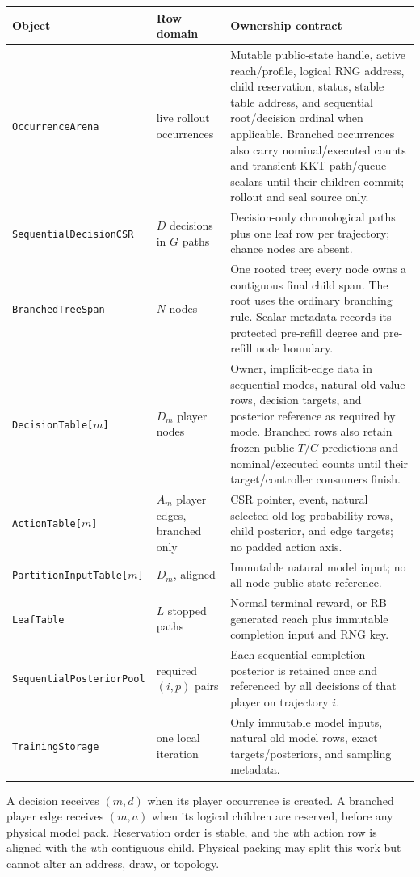 \documentclass[10pt,a4paper]{article}
\newcommand{\Obj}[1]{\texttt{#1}}
\begin{document}
\begin{longtable}{p{}p{}p{}}
\toprule
Object & Row domain & Ownership contract \\
\midrule
\endhead
\Obj{OccurrenceArena} & live rollout occurrences & Mutable public-state handle, active reach/profile, logical RNG address, child reservation, status, stable table address, and sequential root/decision ordinal when applicable.  Branched occurrences also carry nominal/executed counts and transient KKT path/queue scalars until their children commit; rollout and seal source only. \\
\Obj{SequentialDecisionCSR} & $D$ decisions in $G$ paths & Decision-only chronological paths plus one leaf row per trajectory; chance nodes are absent. \\
\Obj{BranchedTreeSpan} & $N$ nodes & One rooted tree; every node owns a contiguous final child span.  The root uses the ordinary branching rule.  Scalar metadata records its protected pre-refill degree and pre-refill node boundary. \\
\Obj{DecisionTable[$m$]} & $D_m$ player nodes & Owner, implicit-edge data in sequential modes, natural old-value rows, decision targets, and posterior reference as required by mode.  Branched rows also retain frozen public $T/C$ predictions and nominal/executed counts until their target/controller consumers finish. \\
\Obj{ActionTable[$m$]} & $A_m$ player edges, branched only & CSR pointer, event, natural selected old-log-probability rows, child posterior, and edge targets; no padded action axis. \\
\Obj{PartitionInputTable[$m$]} & $D_m$, aligned & Immutable natural model input; no all-node public-state reference. \\
\Obj{LeafTable} & $L$ stopped paths & Normal terminal reward, or RB generated reach plus immutable completion input and RNG key. \\
\Obj{SequentialPosteriorPool} & required $(i,p)$ pairs & Each sequential completion posterior is retained once and referenced by all decisions of that player on trajectory $i$. \\
\Obj{TrainingStorage} & one local iteration & Only immutable model inputs, natural old model rows, exact targets/posteriors, and sampling metadata. \\
\bottomrule
\end{longtable}

A decision receives $(m,d)$ when its player occurrence is created.  A branched
player edge receives $(m,a)$ when its logical children are reserved, before any
physical model pack.  Reservation order is stable, and the $u$th action row is
aligned with the $u$th contiguous child.  Physical packing may split this work
but cannot alter an address, draw, or topology.
\end{document}
